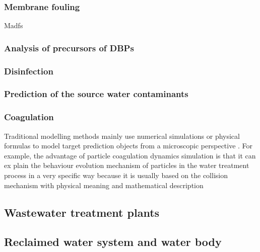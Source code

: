 \subsubsection{Membrane fouling}
Madfs
\subsubsection{Analysis of precursors of DBPs}

\subsubsection{Disinfection}
\subsubsection{Prediction of the source water contaminants}
\subsubsection{Coagulation}
Traditional modelling methods 
mainly use numerical simulations or physical formulas to model target prediction objects from 
a microscopic perspective . For example, the advantage of particle coagulation dynamics 
simulation is that it can ex    plain the behaviour evolution mechanism of particles in the water 
treatment process in a very specific way because it is usually based on the collision mechanism 
with physical meaning and mathematical description

\subsection{Wastewater treatment plants}
\subsection{Reclaimed water system and water body}

